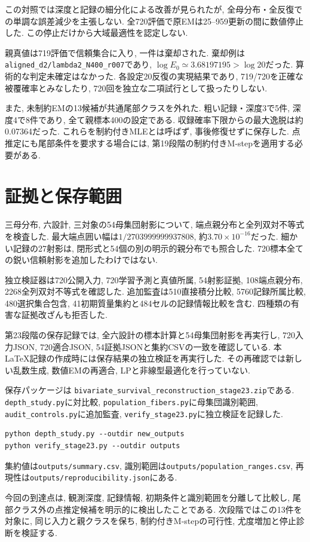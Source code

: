 この対照では深度と記録の細分化による改善が見られたが,
全母分布・全反復での単調な誤差減少を主張しない.
全720評価で原EMは25--959更新の間に数値停止した.
この停止だけから大域最適性を認定しない.

親真値は719評価で信頼集合に入り, 一件は棄却された.
棄却例は\texttt{aligned\_d2/lambda2\_N400\_r007}であり,
$\log E_0\simeq3.68197195>\log20$だった.
算術的な判定未確定はなかった.
各設定20反復の実現結果であり,
719/720を正確な被覆確率とみなしたり,
720回を独立な二項試行として扱ったりしない.

また, 未制約EMの13候補が共通尾部クラスを外れた.
粗い記録・深度3で5件, 深度4で8件であり, 全て親標本400の設定である.
収録確率下限からの最大逸脱は約0.07364だった.
これらを制約付きMLEとは呼ばず, 事後修復せずに保存した.
点推定にも尾部条件を要求する場合には,
第19段階の制約付きM-stepを適用する必要がある.

\section{証拠と保存範囲}
\label{sec:stage23_record}

三母分布, 六設計, 三対象の54母集団射影について,
端点親分布と全列双対不等式を検査した.
最大端点囲い幅は$1/2703999999937808$, 約$3.70\times10^{-16}$だった.
細かい記録の27射影は, 閉形式と54個の別の明示的親分布でも照合した.
720標本全ての鋭い信頼射影を追加したわけではない.

独立検証器は720公開入力, 720学習予測と真値所属,
54射影証拠, 108端点親分布, 2268全列双対不等式を確認した.
追加監査は510直接積分比較, 5760記録所属比較,
480選択集合包含, 41初期質量集約と484セルの記録情報比較を含む.
四種類の有害な証拠改ざんも拒否した.

第23段階の保存記録では, 全六設計の標本計算と54母集団射影を再実行し,
720入力JSON, 720適合JSON, 54証拠JSONと集約CSVの一致を確認している.
本LaTeX記録の作成時には保存結果の独立検証を再実行した.
その再確認では新しい乱数生成, 数値EMの再適合,
LPと非線型最適化を行っていない.

保存パッケージは
\nolinkurl{bivariate_survival_reconstruction_stage23.zip}である.
\texttt{depth\_study.py}に対比較,
\texttt{population\_fibers.py}に母集団識別範囲,
\texttt{audit\_controls.py}に追加監査,
\texttt{verify\_stage23.py}に独立検証を記録した.
\begin{verbatim}
python depth_study.py --outdir new_outputs
python verify_stage23.py --outdir outputs
\end{verbatim}
集約値は\nolinkurl{outputs/summary.csv},
識別範囲は\nolinkurl{outputs/population_ranges.csv},
再現性は\nolinkurl{outputs/reproducibility.json}にある.

今回の到達点は, 観測深度, 記録情報, 初期条件と識別範囲を分離して比較し,
尾部クラス外の点推定候補を明示的に検出したことである.
次段階ではこの13件を対象に, 同じ入力と親クラスを保ち,
制約付きM-stepの可行性, 尤度増加と停止診断を検証する.
